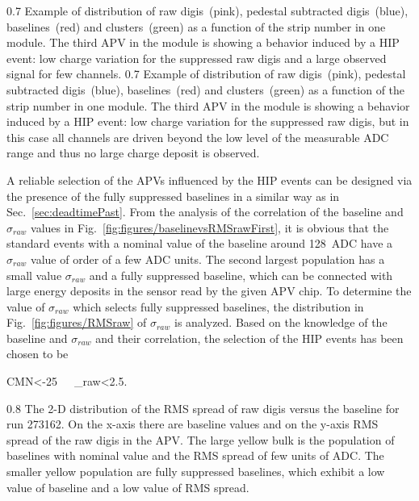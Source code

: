                  {0.7}       %
                 {Example of distribution of raw digis~(pink), pedestal subtracted digis~(blue), baselines~(red) and clusters~(green) as a function of the strip number in one module. The third APV in the module is showing a behavior induced by a HIP event: low charge variation for the suppressed raw digis and a large observed signal for few channels. } %
                 {0.7}       %
                 {Example of distribution of raw digis~(pink), pedestal subtracted digis~(blue), baselines~(red) and clusters~(green) as a function of the strip number in one module. The third APV in the module is showing a behavior induced by a HIP event: low charge variation for the suppressed raw digis, but in this case all channels are driven beyond the low level of the measurable ADC range and thus no large charge deposit is observed. } %

A reliable selection of the APVs influenced by the HIP events can be designed via the presence of the fully suppressed baselines in a similar way as in Sec.~\ref{sec:deadtimePast}. From the analysis of the correlation of the baseline and $\sigma_{raw}$ values in Fig.~\ref{fig:figures/baselinevsRMSrawFirst}, it is obvious that the standard events with a nominal value of the baseline around 128~ADC have a $\sigma_{raw}$ value of order of a few ADC units.  The second largest population has a small value $\sigma_{raw}$ and a fully suppressed baseline, which can be connected with large energy deposits in the sensor read by the given APV chip. To determine the value of $\sigma_{raw}$ which selects fully suppressed baselines, the distribution in Fig.~\ref{fig:figures/RMSraw} of $\sigma_{raw}$ is analyzed. Based on the knowledge of the baseline and $\sigma_{raw}$ and their correlation, the selection of the HIP events has been chosen to be 

{
CMN<-25~~~\sigma_{raw}<2.5.
}


                 {0.8}       %
                 {The 2-D distribution of the RMS spread of raw digis versus the baseline for run 273162. On the x-axis there are baseline values and on the y-axis RMS spread of the raw digis in the APV. The large yellow bulk is the population of baselines with nominal value and the RMS spread of few units of ADC. The smaller yellow population are fully suppressed baselines, which exhibit a low value of baseline and a low value of RMS spread. } %

